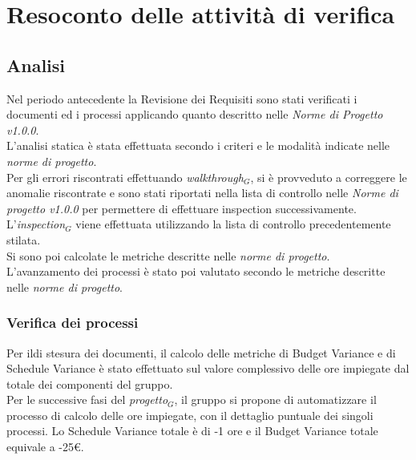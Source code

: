 \chapter{Resoconto delle attività di verifica}
\label{resoconto}
\section{Analisi}
Nel periodo antecedente la Revisione dei Requisiti sono stati verificati i documenti ed i processi applicando quanto descritto nelle \textit{Norme di Progetto v1.0.0}.\\
L'analisi statica è stata effettuata secondo i criteri e le modalità indicate nelle \textit{norme di progetto}.\\ 
Per gli errori riscontrati effettuando \textit{walkthrough$_{G}$}, si è provveduto a correggere le anomalie riscontrate e sono stati riportati nella lista di controllo nelle \textit{Norme di progetto v1.0.0} per permettere di effettuare inspection successivamente.\\
L'\textit{inspection$_{G}$} viene effettuata utilizzando la lista di controllo precedentemente stilata. \\
Si sono poi calcolate le metriche descritte nelle \textit{norme di progetto}.\\
L'avanzamento dei processi è stato poi valutato secondo le metriche descritte nelle \textit{norme di progetto}. 
\subsection{Verifica dei processi}
Per ildi stesura dei documenti, il calcolo delle metriche di Budget Variance e di Schedule Variance è stato effettuato sul valore complessivo delle ore impiegate dal totale dei componenti del gruppo.\\
Per le successive fasi del \textit{progetto$_{G}$}, il gruppo si propone di automatizzare il processo di calcolo delle ore impiegate, con il dettaglio puntuale dei singoli processi.
Lo Schedule Variance totale è di -1 ore e il Budget Variance totale equivale a -25\euro.

\\
